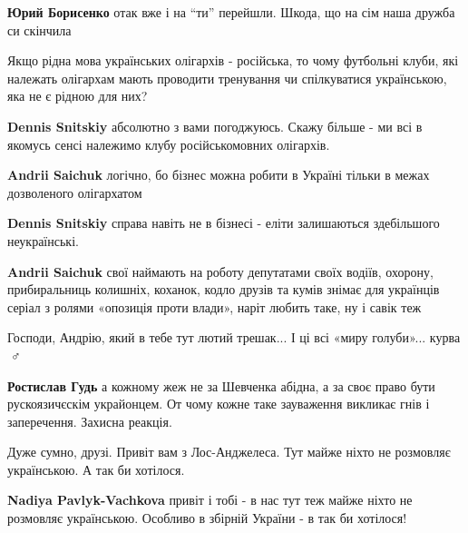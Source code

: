 \begin{itemize}
\begin{itemize}
\textbf{Юрий Борисенко} отак вже і на \enquote{ти} перейшли. Шкода, що на сім наша дружба си скінчила
\end{itemize}


Якщо рідна мова українських олігархів - російська, то чому футбольні клуби, які
належать олігархам мають проводити тренування чи спілкуватися українською, яка
не є рідною для них?

\begin{itemize}
\textbf{Dennis Snitskiy} абсолютно з вами погоджуюсь. Скажу більше - ми всі в
якомусь сенсі належимо клубу російськомовних олігархів.

\textbf{Andrii Saichuk} логічно, бо бізнес можна робити в Україні тільки в межах дозволеного олігархатом

\textbf{Dennis Snitskiy} справа навіть не в бізнесі - еліти залишаються здебільшого неукраїнські.

\textbf{Andrii Saichuk} свої наймають на роботу депутатами своїх водіїв,
охорону, прибиральниць колишніх, коханок, кодло друзів та кумів знімає для
українців серіал з ролями «опозиція проти влади», наріт любить таке, ну і
савік теж
\end{itemize}

Господи, Андрію, який в тебе тут лютий трешак... І ці всі «миру голуби»... курва
🤦♂️

\begin{itemize}
\textbf{Ростислав Гудь} а кожному жеж не за Шевченка абідна, а за своє право
бути рускоязичєскім украйонцем. От чому кожне таке зауваження викликає гнів і
заперечення. Захисна реакція.
\end{itemize}


Дуже сумно, друзі. Привіт вам з Лос-Анджелеса. Тут майже ніхто не розмовляє
українською. А так би хотілося.

\begin{itemize}
\textbf{Nadiya Pavlyk-Vachkova} привіт і тобі - в нас тут теж майже ніхто не
розмовляє українською. Особливо в збірній України - в так би хотілося!



\end{itemize}
\end{itemize}
